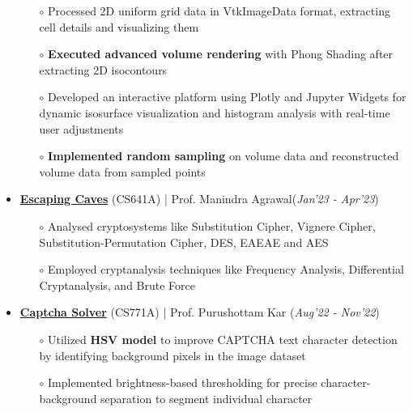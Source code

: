 \documentclass[10.8pt, a4paper]{extarticle}
\begin{document}
\begin{itemize}
	\begin{itemize}
	    \item[$\circ$] Processed 2D uniform grid data in VtkImageData format, extracting cell details and visualizing them \\[-0.6cm]
	    \item[$\circ$] \textbf{Executed advanced volume rendering} with Phong Shading after extracting 2D isocontours \\[-0.6cm]
	    \item[$\circ$] Developed an interactive platform using Plotly and Jupyter Widgets for dynamic isosurface visualization and histogram analysis with real-time user adjustments\\[-0.6cm]
	    \item[$\circ$]\textbf{Implemented random sampling} on volume data and reconstructed volume data from sampled points \\[-0.6cm]
	\end{itemize}
  \vspace{0.055cm}
  \item \href{https://github.com/Vinay-Agrawal29/CS641-Modern-Cryptology-Assignmets} {\textbf{Escaping Caves}} (CS641A) | Prof. Manindra Agrawal\hfill\hfill(\textit{Jan'23 - Apr'23})
	\begin{itemize}
	    \item[$\circ$] Analysed cryptosystems like Substitution Cipher, Vignere Cipher, Substitution-Permutation Cipher, DES, EAEAE and AES \\[-0.6cm]
	    \item[$\circ$] Employed cryptanalysis techniques like Frequency Analysis, Differential Cryptanalysis, and Brute Force \\[-0.6cm]
	\end{itemize}
  \vspace{0.055cm}
  \item \href{https://github.com/Vinay-Agrawal29/Captcha-Solver-CS771} {\textbf{Captcha Solver}} (CS771A) | Prof. Purushottam Kar  \hfill\hfill(\textit{Aug'22 - Nov'22})
  \begin{itemize}
    \item[$\circ$] Utilized \textbf{HSV model} to improve CAPTCHA text character detection by identifying background pixels in the image dataset \\[-0.6cm]
    \item[$\circ$] Implemented brightness-based thresholding for precise character-background separation to segment individual character\\[-0.6cm]

\end{itemize}
\end{itemize}
\end{document}
